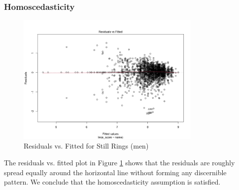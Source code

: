 \documentclass{article}
\begin{document}
\subsubsection{Homoscedasticity}
\begin{figure}[H]
    \centering
    \includegraphics[width=0.8\textwidth]{../plots/m_resid_sr.png}
    \caption{Residuals vs. Fitted for Still Rings (men)}
    \label{fig:sr_m_resid}
\end{figure}

\noindent The residuals vs. fitted plot in Figure \ref{fig:sr_m_resid} shows that the residuals 
are roughly spread equally around the horizontal line without forming any discernible pattern. 
We conclude that the homoscedasticity assumption is satisfied.
\end{document}
